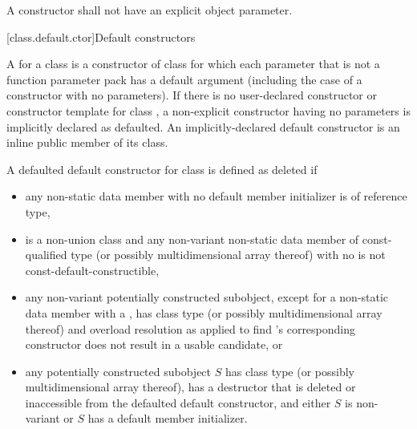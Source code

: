 \pnum
A constructor shall not have an explicit object parameter.

[class.default.ctor]{Default constructors}

\pnum
{}%
%
A  for a class 
is a constructor of class 
for which each parameter
that is not a function parameter pack
has a default argument
(including the case of a constructor with no parameters).
%
If there is no user-declared constructor or constructor template for class
,
a non-explicit constructor having no parameters is implicitly declared
as defaulted.
An implicitly-declared default constructor is an
inline public member of its class.

\pnum
A defaulted default constructor for class  is defined as deleted if
\begin{itemize}
\item any non-static data member with no default member initializer is
of reference type,

\item {} is a non-union class and
any non-variant non-static data member of const-qualified type
(or possibly multidimensional array thereof)
with no 
is not const-default-constructible,

\item any non-variant potentially constructed subobject, except for a non-static data member
with a ,
has class type  (or possibly multidimensional array thereof)
and overload resolution
as applied to find 's corresponding constructor
does not result in a usable candidate, or

\item any potentially constructed subobject $S$ has
class type  (or possibly multidimensional array thereof),
 has
a destructor that is deleted or inaccessible from the defaulted default
constructor, and
either $S$ is non-variant or $S$ has a default member initializer.
\end{itemize}

